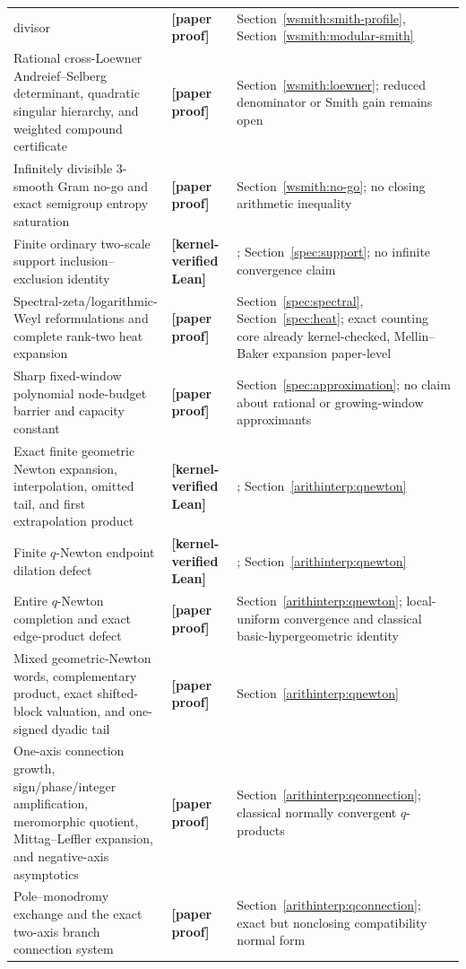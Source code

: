 \documentclass[11pt,oneside]{article}
\theoremstyle{definition}
\theoremstyle{remark}
\newcommand{\lean}[1]{\texttt{\detokenize{#1}}}
\newcommand{\statuslean}{\textcolor{leanblue}{\textbf{[kernel-verified Lean]}}}
\newcommand{\statusnew}{\textcolor{newgreen}{\textbf{[paper proof]}}}
\begin{document}
{\begin{longtable}{>{\raggedright\arraybackslash}p{}
                  >{\raggedright\arraybackslash}p{}
                  >{\raggedright\arraybackslash}p{}}
divisor & \statusnew & Section~\ref{wsmith:smith-profile}, Section~\ref{wsmith:modular-smith} \\
Rational cross-Loewner Andreief--Selberg determinant, quadratic singular hierarchy, and
weighted compound certificate & \statusnew & Section~\ref{wsmith:loewner}; reduced denominator
or Smith gain remains open \\
Infinitely divisible $3$-smooth Gram no-go and exact semigroup entropy saturation &
\statusnew & Section~\ref{wsmith:no-go}; no closing arithmetic inequality \\
Finite ordinary two-scale support inclusion--exclusion identity & \statuslean &
\lean{TwoScaleSupportFinite}; Section~\ref{spec:support}; no infinite convergence claim \\
Spectral-zeta/logarithmic-Weyl reformulations and complete rank-two heat expansion &
\statusnew & Section~\ref{spec:spectral}, Section~\ref{spec:heat}; exact counting core already
kernel-checked, Mellin--Baker expansion paper-level \\
Sharp fixed-window polynomial node-budget barrier and capacity constant & \statusnew &
Section~\ref{spec:approximation}; no claim about rational or growing-window approximants \\
Exact finite geometric Newton expansion, interpolation, omitted tail, and first extrapolation
product & \statuslean & \lean{GeometricNewtonInterpolation}; Section~\ref{arithinterp:qnewton} \\
Finite $q$-Newton endpoint dilation defect & \statuslean &
\lean{QNewtonEndpointDefect}; Section~\ref{arithinterp:qnewton} \\
Entire $q$-Newton completion and exact edge-product defect & \statusnew &
Section~\ref{arithinterp:qnewton}; local-uniform convergence and classical
basic-hypergeometric identity \\
Mixed geometric-Newton words, complementary product, exact shifted-block valuation, and
one-signed dyadic tail & \statusnew & Section~\ref{arithinterp:qnewton} \\
One-axis connection growth, sign/phase/integer amplification, meromorphic quotient,
Mittag--Leffler expansion, and negative-axis asymptotics & \statusnew &
Section~\ref{arithinterp:qconnection}; classical normally convergent $q$-products \\
Pole--monodromy exchange and the exact two-axis branch connection system & \statusnew &
Section~\ref{arithinterp:qconnection}; exact but nonclosing compatibility normal form \\

\end{longtable}}
\end{document}
